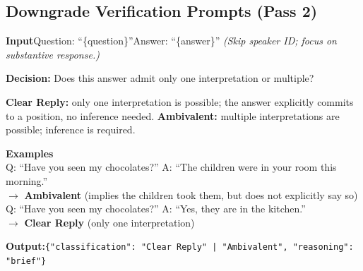 \documentclass[11pt]{article}
\begin{document}
\subsection{Downgrade Verification Prompts (Pass 2)}

\begin{tcolorbox}[colback=passtwo!5, colframe=passtwo, fonttitle=\bfseries\footnotesize, title=Pass 2a: Clear Reply $\rightarrow$ Ambivalent, breakable, boxrule=0.4pt, arc=3pt, left=5pt, right=5pt, top=3pt, bottom=3pt, fontupper=\footnotesize, before skip=6pt, after skip=6pt, toptitle=2pt, bottomtitle=2pt]
\textbf{Input}\quad Question: ``\{question\}''\quad Answer: ``\{answer\}''\quad
\textit{(Skip speaker ID; focus on substantive response.)}\smallskip

\textbf{Decision:} Does this answer admit only one interpretation or multiple?\smallskip

\textbf{Clear Reply:} only one interpretation is possible; the answer explicitly commits to a position, no inference needed.\quad
\textbf{Ambivalent:} multiple interpretations are possible; inference is required.\smallskip

\textbf{Examples}\\
Q: ``Have you seen my chocolates?'' A: ``The children were in your room this morning.''\\
$\rightarrow$ \textbf{Ambivalent} (implies the children took them, but does not explicitly say so)\\
Q: ``Have you seen my chocolates?'' A: ``Yes, they are in the kitchen.''\\
$\rightarrow$ \textbf{Clear Reply} (only one interpretation)\smallskip

\textbf{Output:}\quad \texttt{\{"classification": "Clear Reply" | "Ambivalent", "reasoning": "brief"\}}
\end{tcolorbox}
\end{document}
